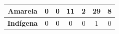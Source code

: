 \begin{table}[H]
{\begin{tabular}{c|cc|cc|cc|}
\multicolumn{1}{|c|}{\cellcolor[HTML]{C0C0C0}\textbf{Amarela}}           & \multicolumn{1}{c|}{0}                                       & 0                                         & \multicolumn{1}{c|}{11}                                      & 2                                         & \multicolumn{1}{c|}{29}                                      & 8                                         \\ \hline
\multicolumn{1}{|c|}{\cellcolor[HTML]{C0C0C0}\textbf{Indígena}}          & \multicolumn{1}{c|}{0}                                       & 0                                         & \multicolumn{1}{c|}{0}                                       & 0                                         & \multicolumn{1}{c|}{1}                                       & 0                                         \\ \hline
\end{tabular}%
}
\end{table}

